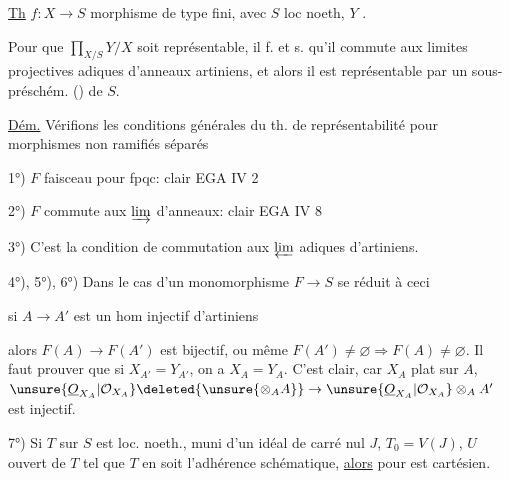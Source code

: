 
\uline{Th} $f:X\to S$ morphisme  de type fini, avec $S$ loc noeth, $Y$ .

Pour que $\prod_{X/S}Y/X$ soit représentable, il f. et s. qu'il commute aux limites projectives adiques d'anneaux artiniens, et alors il est représentable par un sous-préschém. () de $S$.




\uline{Dém.} Vérifions les conditions générales du th. de représentabilité pour morphismes non ramifiés séparés

1°) $F$ faisceau pour fpqc:  clair EGA IV 2

2°) $F$ commute aux $\varinjlim$ d'anneaux: clair EGA IV 8


3°) C'est la condition de commutation aux $\varprojlim$ adiques d'artiniens.

4°), 5°), 6°) Dans le cas d'un monomorphisme $F\to S$ se réduit à ceci


si $A\to A'$ est un hom injectif d'artiniens 

alors $F(A)\to F(A')$ est bijectif, ou même $F(A')\ne\varnothing\Rightarrow F(A)\ne\varnothing$. Il faut prouver que si $X_{A'}=Y_{A'}$, on a $X_A=Y_A$. C'est clair, car $X_A$  plat sur $A$, $\unsure{\underline O_{X_A}|\mathcal O_{X_A}}\deleted{\unsure{\otimes_A A}}\to\unsure{\underline O_{X_A}|\mathcal O_{X_A}}\otimes_A A'$ est injectif.


7°) Si $T$ sur $S$ est  loc. noeth., muni d'un idéal de carré nul $J$, $T_0=V(J)$, $U$ ouvert de $T$ tel que $T$ en soit l'adhérence schématique, \uline{alors} pour 
est cartésien.

